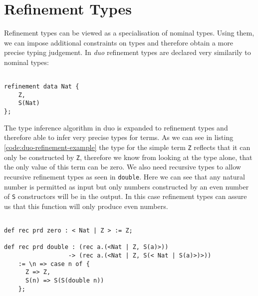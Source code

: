 \section{Refinement Types}
\label{sec:refinement-types}
Refinement types can be viewed as a specialisation of nominal types.
Using them, we can impose additional constraints on types and therefore obtain a more precise typing judgement. \cite{springer} %
In \emph{duo} refinement types are declared very similarily to nominal types:

\begin{lstlisting}[style=duostyle, label=code:duo-refinement-declaration, captionpos=b, caption={Refinement type of peano numbers in \emph{duo}}]

refinement data Nat {
    Z,
    S(Nat)
};

\end{lstlisting}

The type inference algorithm in duo is expanded to refinement types and therefore able to infer very precise types for terms. \cite{binder22refinement}
As we can see in listing \ref{code:duo-refinement-example} the type for the simple term \lstinline{Z} reflects that it can only be constructed by \lstinline{Z}, therefore we know from looking at the type alone, that the only value of this term can be zero.
We also need recursive types to allow recursive refinement types as seen in \lstinline{double}.
Here we can see that any natural number is permitted as input but only numbers constructed by an even number of \lstinline{S} constructors will be in the output.
In this case refinement types can assure us that this function will only produce even numbers.

\begin{lstlisting}[style=duostyle, label=code:duo-refinement-example, captionpos=b, caption={Type inference for refinement types in \emph{duo}}]

def rec prd zero : < Nat | Z > := Z;

def rec prd double : (rec a.(<Nat | Z, S(a)>))
                  -> (rec a.(<Nat | Z, S(< Nat | S(a)>)>))
    := \n => case n of {
      Z => Z,
      S(n) => S(S(double n))
    };
    
\end{lstlisting}

